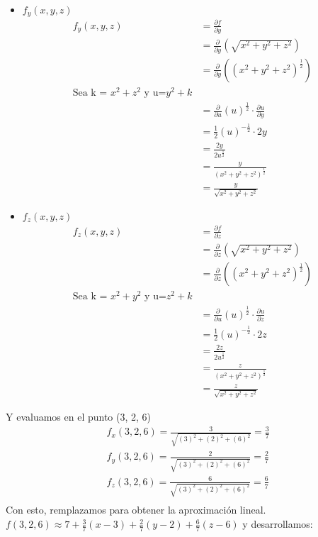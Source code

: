 \documentclass[12pt]{article}
\begin{document}
\begin{itemize}[format=\textbf]
\begin{itemize}
  \item $f_y(x,y,z)$ \\
  \begin{align*}
    f_y(x,y,z) &= \frac{\partial f}{\partial y} \\
    &= \frac{\partial}{\partial y} \left( \sqrt{x^2+y^2+z^2} \right) \\
    &= \frac{\partial}{\partial y} \left( (x^2+y^2+z^2)^{\frac{1}{2}} \right) \\
     \text{Sea k = $x^2 + z^2$ y u=$y^2 + k$} \\
     &= \frac{\partial}{\partial u}(u)^{\frac{1}{2}} \cdot \frac{\partial u}{\partial y} \\
     &= \frac{1}{2}(u)^{-\frac{1}{2}} \cdot 2y \\
     &= \frac{2y}{2u^{\frac{1}{2}}} \\
     &= \frac{y}{(x^2 + y^2 + z^2)^{\frac{1}{2}}}\\
     &= \frac{y}{\sqrt{x^2 + y^2 + z^2}}
  \end{align*}

   \item $f_z(x,y,z)$ \\
  \begin{align*}
    f_z(x,y,z) &= \frac{\partial f}{\partial z} \\
    &= \frac{\partial}{\partial z} \left( \sqrt{x^2+y^2+z^2} \right) \\
    &= \frac{\partial}{\partial z} \left( (x^2+y^2+z^2)^{\frac{1}{2}} \right) \\
     \text{Sea k = $x^2 + y^2$ y u=$z^2 + k$} \\
     &= \frac{\partial}{\partial u}(u)^{\frac{1}{2}} \cdot \frac{\partial u}{\partial z} \\
     &= \frac{1}{2}(u)^{-\frac{1}{2}} \cdot 2z \\
     &= \frac{2z}{2u^{\frac{1}{2}}} \\
     &= \frac{z}{(x^2 + y^2 + z^2)^{\frac{1}{2}}}\\
     &= \frac{z}{\sqrt{x^2 + y^2 + z^2}}
  \end{align*}
  
\end{itemize}

Y evaluamos en el punto (3, 2, 6) \\
\begin{align*}
&f_x(3,2,6)=\frac{3}{\sqrt{(3)^2+(2)^2+(6)^2}} = \frac{3}{7}\\
  &f_y(3,2,6)=\frac{2}{\sqrt{(3)^2+(2)^2+(6)^2}} = \frac{2}{7}\\
  &f_z(3,2,6) = \frac{6}{\sqrt{(3)^2+(2)^2+(6)^2}} = \frac{6}{7}\\
\end{align*}
Con esto, remplazamos para obtener la aproximación lineal.
$f(3,2,6) \approx 7 + \frac{3}{7}(x-3)+ \frac{2}{7}(y-2) +  \frac{6}{7}(z-6)$ y desarrollamos:


\end{itemize}
\end{document}
